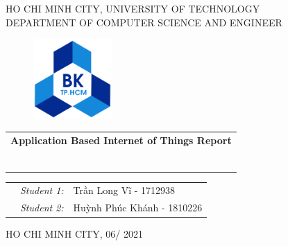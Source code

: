 \documentclass[13pt,a4paper]{article}
\begin{document}
	

\begin{titlepage}
	\begin{center}
		HO CHI MINH CITY, UNIVERSITY OF TECHNOLOGY \\
		DEPARTMENT OF COMPUTER SCIENCE AND ENGINEER
	\end{center}
	
	\vspace{1cm}
	
	\begin{figure}[h!]
		\begin{center}
			\includegraphics[width=3cm]{hcmut.png}
		\end{center}
	\end{figure}
	
	\vspace{2cm}
	
	
	\begin{center}
		\begin{tabular}{c}
			\multicolumn{1}{c}{\textbf{{\Large Application Based Internet of Things Report}}}
			
			
			
			~~\\
			
			\\
			\multicolumn{1}{l}{\textbf{{\Large}}}\\
			\\
			\textbf{{\Large}}\\
			
			\\
			\\
			
		\end{tabular}
	\end{center}
	
	\vspace{3cm}
	
	\begin{table}[h]
		\begin{tabular}{rrl}
			\hspace{5.1cm} 
			&\textit{Student 1: } & Trần Long Vĩ - 1712938\\
			&\textit{Student 2: } & Huỳnh Phúc Khánh - 1810226\\
		\end{tabular}
	\end{table}
	\vspace{3cm}
	\begin{center}
		{\footnotesize HO CHI MINH CITY, 06/ 2021}
	\end{center}
\end{titlepage}
	
\end{document}
